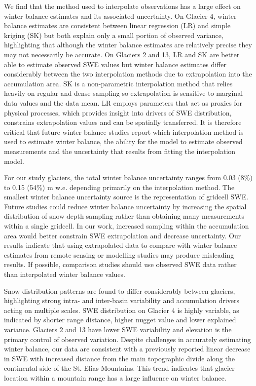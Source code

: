 \documentclass[twocolumn, letterpaper]{igs}
\begin{document}
We find that the method used to interpolate observations has a large effect on winter balance estimates and its associated uncertainty. On Glacier 4, winter balance estimates are consistent between linear regression (LR) and simple kriging (SK) but both explain only a small portion of observed variance, highlighting that although the winter balance estimates are relatively precise they may not necessarily be accurate. On Glaciers 2 and 13, LR and SK are better able to estimate observed SWE values but winter balance estimates differ considerably between the two interpolation methods due to extrapolation into the accumulation area. SK is a non-parametric interpolation method that relies heavily on regular and dense sampling so extrapolation is sensitive to marginal data values and the data mean. LR employs parameters that act as proxies for physical processes, which provides insight into drivers of SWE distribution, constrains extrapolation values and can be spatially transferred. It is therefore critical that future winter balance studies report which interpolation method is used to estimate winter balance, the ability for the model to estimate observed measurements and the uncertainty that results from fitting the interpolation model. 

For our study glaciers, the total winter balance uncertainty ranges from 0.03 (8\%) to 0.15 (54\%) m w.e. depending primarily on the interpolation method. The smallest winter balance uncertainty source is the representation of gridcell SWE. Future studies could reduce winter balance uncertainty by increasing the spatial distribution of snow depth sampling rather than obtaining many measurements within a single gridcell. In our work, increased sampling within the accumulation area would better constrain SWE extrapolation and decrease uncertainty. Our results indicate that using extrapolated data to compare with winter balance estimates from remote sensing or modelling studies may produce misleading results. If possible, comparison studies should use observed SWE data rather than interpolated winter balance values. 

Snow distribution patterns are found to differ considerably between glaciers, highlighting strong intra- and inter-basin variability and accumulation drivers acting on multiple scales. SWE distribution on Glacier 4 is highly variable, as indicated by shorter range distance, higher nugget value and lower explained variance. Glaciers 2 and 13 have lower SWE variability and elevation is the primary control of observed variation. Despite challenges in accurately estimating winter balance, our data are consistent with a previously reported linear decrease in SWE with increased distance from the main topographic divide along the continental side of the St. Elias Mountains. This trend indicates that glacier location within a mountain range has a large influence on winter balance. 
\end{document}
